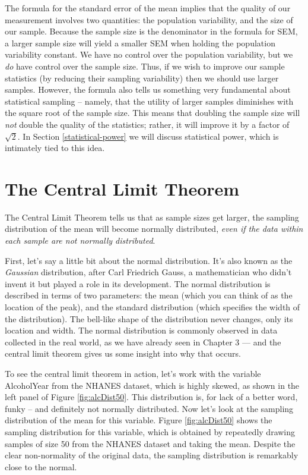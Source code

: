 \documentclass[12pt,]{book}
\theoremstyle{definition}
\theoremstyle{definition}
\theoremstyle{definition}
\theoremstyle{remark}
\begin{document}
The formula for the standard error of the mean implies that the quality of our measurement involves two quantities: the population variability, and the size of our sample. Because the sample size is the denominator in the formula for SEM, a larger sample size will yield a smaller SEM when holding the population variability constant. We have no control over the population variability, but we \emph{do} have control over the sample size. Thus, if we wish to improve our sample statistics (by reducing their sampling variability) then we should use larger samples. However, the formula also tells us something very fundamental about statistical sampling -- namely, that the utility of larger samples diminishes with the square root of the sample size. This means that doubling the sample size will \emph{not} double the quality of the statistics; rather, it will improve it by a factor of \(\sqrt{2}\). In Section \ref{statistical-power} we will discuss statistical power, which is intimately tied to this idea.

\hypertarget{the-central-limit-theorem}{%
\section{The Central Limit Theorem}\label{the-central-limit-theorem}}

The Central Limit Theorem tells us that as sample sizes get larger, the sampling distribution of the mean will become normally distributed, \emph{even if the data within each sample are not normally distributed}.

First, let's say a little bit about the normal distribution. It's also known as the \emph{Gaussian} distribution, after Carl Friedrich Gauss, a mathematician who didn't invent it but played a role in its development. The normal distribution is described in terms of two parameters: the mean (which you can think of as the location of the peak), and the standard distribution (which specifies the width of the distribution). The bell-like shape of the distribution never changes, only its location and width. The normal distribution is commonly observed in data collected in the real world, as we have already seen in Chapter 3 --- and the central limit theorem gives us some insight into why that occurs.

To see the central limit theorem in action, let's work with the variable AlcoholYear from the NHANES dataset, which is highly skewed, as shown in the left panel of Figure \ref{fig:alcDist50}. This distribution is, for lack of a better word, funky -- and definitely not normally distributed. Now let's look at the sampling distribution of the mean for this variable. Figure \ref{fig:alcDist50} shows the sampling distribution for this variable, which is obtained by repeatedly drawing samples of size 50 from the NHANES dataset and taking the mean. Despite the clear non-normality of the original data, the sampling distribution is remarkably close to the normal.
\end{document}
